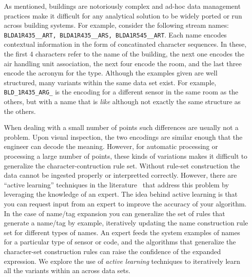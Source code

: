 %
As mentioned, buildings are notoriously complex and  ad-hoc data management practices
make it difficult for any analytical solution to be widely ported or run across building
systems.  For example, consider the following stream names: \texttt{BLDA1R435\_\_ART,
BLDA1R435\_\_ARS, BLDA1R545\_\_ART}. Each name encodes contextual information in the form
of concatinated character sequences. In these, the first 4 characters refer to the 
name of the building, the next one encodes the air handling unit association, the next 
four encode the room,
and the last three encode the acronym for the type.  Although the examples given are well
structured, many variants within the same data set exist.  For example, \texttt{BLD\_1R435\_ARG\_}
is the encoding for a different sensor in the same room as the others, but with a name
that is \emph{like} although not exactly the same structure as the others.


When dealing with a small number of points such differences are usually not a problem.  Upon 
visual inspection, the two
encodings are similar enough that the engineer can decode the meaning.  However, for automatic 
processing or processing a large number of points, these kinds of variations makes it difficult 
to generalize the character-contruction
rule set.  Without rule-set construction the data cannot be ingested properly or interpretted
correctly.  However, there are ``active learning'' techniques in the literature~\cite{ms} 
that address this problem by leveraging the knowledge of an expert. The idea behind active learning
is that you can request input from an expert to improve the accuracy of your algorithm.
In the case of name/tag expansion you 
can generalize the set of rules that generate a name/tag by example, iteratively
updating the name construction rule set for different types of names.  An expert feeds
the system examples of names for a particular type of sensor or code, and the algorithms 
that generalize the character-set construction rules can raise the confidence of the
expanded expression.
We explore the use
of \emph{active learning} techniques to iteratively learn all the variants within an across
data sets.

